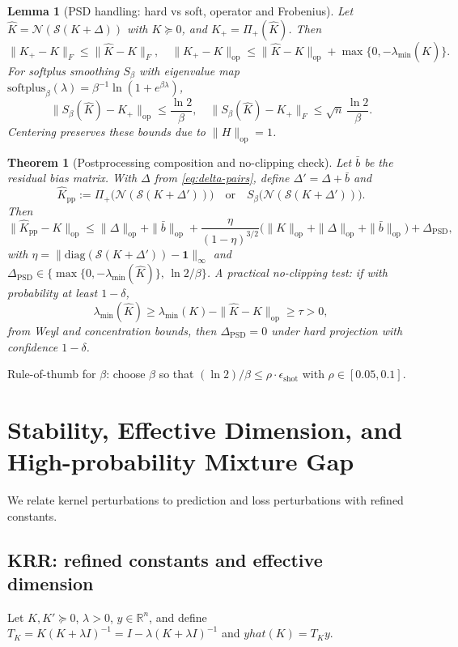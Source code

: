 \documentclass{article}
\newtheorem{theorem}{Theorem}
\newtheorem{lemma}{Lemma}
\begin{document}
\begin{lemma}[PSD handling: hard vs soft, operator and Frobenius]\label{lem:psd}
Let $\widehat{K}=\mathcal{N}(\mathcal{S}(K+\Delta))$ with $K\succeq 0$, and $K_+=\Pi_+(\widehat{K})$. Then
\[
\|K_+-K\|_F \le \|\widehat{K}-K\|_F,\quad \|K_+-K\|_{\mathrm{op}} \le \|\widehat{K}-K\|_{\mathrm{op}}+\max\{0,-\lambda_{\min}(\widehat{K})\}.
\]
For softplus smoothing $S_\beta$ with eigenvalue map $\mathrm{softplus}_\beta(\lambda)=\beta^{-1}\ln(1+e^{\beta \lambda})$,
\[
\|S_\beta(\widehat{K})-K_+\|_{\mathrm{op}}\le \frac{\ln 2}{\beta},\quad \|S_\beta(\widehat{K})-K_+\|_{F}\le \sqrt{n}\,\frac{\ln 2}{\beta}.
\]
Centering preserves these bounds due to $\|H\|_{\mathrm{op}}=1$.
\end{lemma}

\begin{theorem}[Postprocessing composition and no-clipping check]\label{thm:post-comp}
Let $\bar{b}$ be the residual bias matrix. With $\Delta$ from \eqref{eq:delta-pairs}, define $\Delta'=\Delta+\bar{b}$ and
\[
\widehat{K}_{\mathrm{pp}}:=\Pi_+\big(\mathcal{N}(\mathcal{S}(K+\Delta'))\big)\quad\text{or}\quad S_\beta\big(\mathcal{N}(\mathcal{S}(K+\Delta'))\big).
\]
Then
\[
\|\widehat{K}_{\mathrm{pp}}-K\|_{\mathrm{op}} \le \|\Delta\|_{\mathrm{op}} + \|\bar{b}\|_{\mathrm{op}} + \frac{\eta}{(1-\eta)^{3/2}}\big(\|K\|_{\mathrm{op}}+\|\Delta\|_{\mathrm{op}}+\|\bar{b}\|_{\mathrm{op}}\big) + \Delta_{\mathrm{PSD}},
\]
with $\eta=\|\mathrm{diag}(\mathcal{S}(K+\Delta'))-\mathbf{1}\|_\infty$ and $\Delta_{\mathrm{PSD}}\in\{ \max\{0,-\lambda_{\min}(\widehat{K})\},\, \ln 2/\beta\}$. A practical no-clipping test: if with probability at least $1-\delta$,
\[
\lambda_{\min}(\widehat{K}) \ge \lambda_{\min}(K) - \|\widehat{K}-K\|_{\mathrm{op}} \ge \tau > 0,
\]
from Weyl and concentration bounds, then $\Delta_{\mathrm{PSD}}=0$ under hard projection with confidence $1-\delta$.
\end{theorem}

Rule-of-thumb for $\beta$: choose $\beta$ so that $(\ln 2)/\beta \le \rho\cdot \epsilon_{\mathrm{shot}}$ with $\rho\in[0.05,0.1]$.

\section{Stability, Effective Dimension, and High-probability Mixture Gap}\label{sec:stability}
We relate kernel perturbations to prediction and loss perturbations with refined constants.

\subsection{KRR: refined constants and effective dimension}\label{subsec:krr}
Let $K,K'\succeq 0$, $\lambda>0$, $y\in\mathbb{R}^n$, and define $T_K=K(K+\lambda I)^{-1}=I-\lambda (K+\lambda I)^{-1}$ and $yhat(K)=T_K y$.
\end{document}
